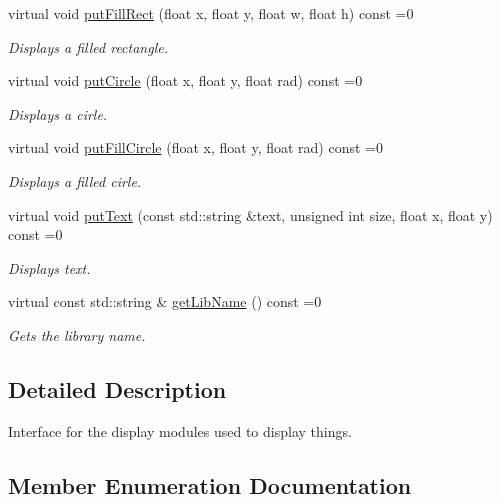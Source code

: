 \begin{DoxyCompactItemize}
virtual void \mbox{\hyperlink{classArcade_1_1Display_1_1IDisplayModule_a1e9f08e3568ac005e92191eea6c0ae4d}{put\+Fill\+Rect}} (float x, float y, float w, float h) const =0
\begin{DoxyCompactList}\small\item\em Displays a filled rectangle. \end{DoxyCompactList}\item 
virtual void \mbox{\hyperlink{classArcade_1_1Display_1_1IDisplayModule_a68b7b140a378dc416ec278d97dc76e9e}{put\+Circle}} (float x, float y, float rad) const =0
\begin{DoxyCompactList}\small\item\em Displays a cirle. \end{DoxyCompactList}\item 
virtual void \mbox{\hyperlink{classArcade_1_1Display_1_1IDisplayModule_aa3d23b9294132b6efb28dbc932892d1b}{put\+Fill\+Circle}} (float x, float y, float rad) const =0
\begin{DoxyCompactList}\small\item\em Displays a filled cirle. \end{DoxyCompactList}\item 
virtual void \mbox{\hyperlink{classArcade_1_1Display_1_1IDisplayModule_a9740f30e3135d3a51851bdca07ef88a3}{put\+Text}} (const std\+::string \&text, unsigned int size, float x, float y) const =0
\begin{DoxyCompactList}\small\item\em Displays text. \end{DoxyCompactList}\item 
virtual const std\+::string \& \mbox{\hyperlink{classArcade_1_1Display_1_1IDisplayModule_a0d8e957815e94766bdefbd7a5043e81a}{get\+Lib\+Name}} () const =0
\begin{DoxyCompactList}\small\item\em Gets the library name. \end{DoxyCompactList}\end{DoxyCompactItemize}


\subsection{Detailed Description}
Interface for the display modules used to display things. 

\subsection{Member Enumeration Documentation}
\mbox{\label{classArcade_1_1Display_1_1IDisplayModule_ae0a776be9163d096051c522e21c007b2}} 
